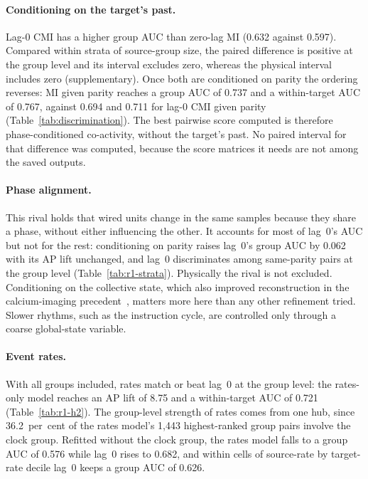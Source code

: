 \paragraph{Conditioning on the target's past.} Lag-0 CMI has a higher group AUC than zero-lag MI (0.632 against 0.597). Compared within strata of source-group size, the paired difference is positive at the group level and its interval excludes zero, whereas the physical interval includes zero (supplementary). Once both are conditioned on parity the ordering reverses: MI given parity reaches a group AUC of 0.737 and a within-target AUC of 0.767, against 0.694 and 0.711 for lag-0 CMI given parity (Table~\ref{tab:discrimination}). The best pairwise score computed is therefore phase-conditioned co-activity, without the target's past. No paired interval for that difference was computed, because the score matrices it needs are not among the saved outputs.


\paragraph{Phase alignment.} This rival holds that wired units change in the same samples because they share a phase, without either influencing the other. It accounts for most of lag~0's AUC but not for the rest: conditioning on parity raises lag~0's group AUC by 0.062 with its AP lift unchanged, and lag~0 discriminates among same-parity pairs at the group level (Table~\ref{tab:r1-strata}). Physically the rival is not excluded. Conditioning on the collective state, which also improved reconstruction in the calcium-imaging precedent~\cite{stetter2012modelfree}, matters more here than any other refinement tried. Slower rhythms, such as the instruction cycle, are controlled only through a coarse global-state variable.


\paragraph{Event rates.} With all groups included, rates match or beat lag~0 at the group level: the rates-only model reaches an AP lift of 8.75 and a within-target AUC of 0.721 (Table~\ref{tab:r1-h2}). The group-level strength of rates comes from one hub, since 36.2~per~cent of the rates model's 1,443 highest-ranked group pairs involve the clock group. Refitted without the clock group, the rates model falls to a group AUC of 0.576 while lag~0 rises to 0.682, and within cells of source-rate by target-rate decile lag~0 keeps a group AUC of 0.626.


